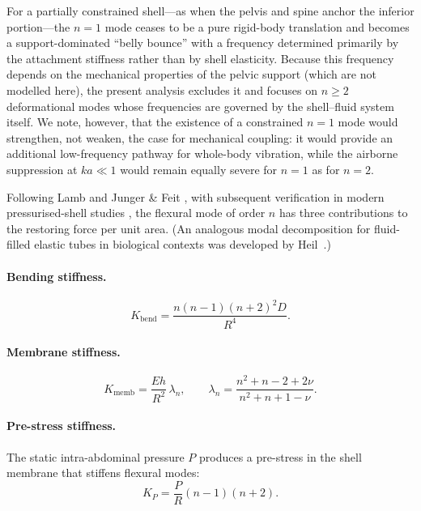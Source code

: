 For a partially constrained shell---as when the pelvis and spine anchor the
inferior portion---the $n = 1$ mode ceases to be a pure rigid-body translation
and becomes a support-dominated ``belly bounce'' with a frequency determined
primarily by the attachment stiffness rather than by shell elasticity.  Because
this frequency depends on the mechanical properties of the pelvic support
(which are not modelled here), the present analysis excludes it and focuses on
$n \geq 2$ deformational modes whose frequencies are governed by the
shell--fluid system itself.  We note, however, that the existence of a
constrained $n = 1$ mode would strengthen, not weaken, the case for mechanical
coupling: it would provide an additional low-frequency pathway for whole-body
vibration, while the airborne suppression at $ka \ll 1$ would remain equally
severe for $n = 1$ as for $n = 2$.

Following Lamb \cite{lamb1882} and Junger \& Feit
\cite{Junger1986}, with subsequent verification in modern pressurised-shell
studies \cite{Kuo2015,Ghaheri2022}, the flexural mode of order $n$ has three contributions
to the restoring force per unit area.  (An analogous modal decomposition
for fluid-filled elastic tubes in biological contexts was developed by
Heil~\cite{Heil1996}.)

\paragraph{Bending stiffness.}
\begin{equation}\label{eq:Kbend}
  K_\mathrm{bend} = \frac{n(n-1)(n+2)^2 D}{R^4}.
\end{equation}

\paragraph{Membrane stiffness.}
\begin{equation}\label{eq:Kmemb}
  K_\mathrm{memb} = \frac{Eh}{R^2}\,\lambda_n,
  \qquad \lambda_n = \frac{n^2 + n - 2 + 2\nu}{n^2 + n + 1 - \nu}.
\end{equation}

\paragraph{Pre-stress stiffness.}
The static intra-abdominal pressure $P$ produces a pre-stress in the
shell membrane that stiffens flexural modes:
\begin{equation}\label{eq:Kpre}
  K_P = \frac{P}{R}(n-1)(n+2).
\end{equation}


